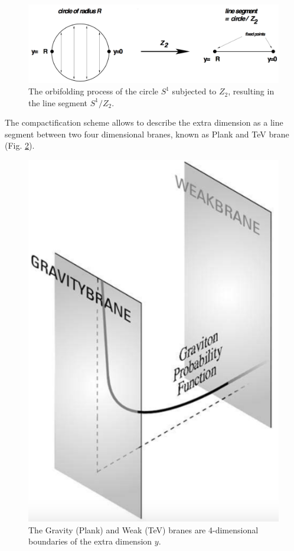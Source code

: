 \begin{figure}[htb!!]
\centering
\includegraphics[scale=0.25]{figures/theory/orbifold.png}
\caption[Orbifold process]{The orbifolding process of the circle $S^1$ subjected to $Z_2$, resulting in the line segment $S^1/Z_2$.}
\label{orbifold}
\end{figure}

The compactification scheme allows to describe the extra dimension as a line segment between two four dimensional branes, known as Plank and TeV brane (Fig. \ref{branes}).

\begin{figure}[htb!!]
\centering
\includegraphics[scale=0.33]{figures/theory/branes.png}
\caption[Gravity and weak branes]{The Gravity (Plank) and Weak (TeV) branes are 4-dimensional boundaries of the extra dimension $y$.}
\label{branes}
\end{figure}


